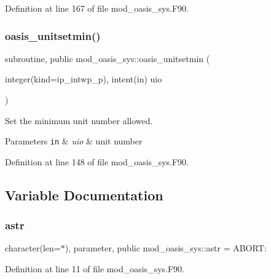 Definition at line 167 of file mod\+\_\+oasis\+\_\+sys.\+F90.

\mbox{\label{namespacemod__oasis__sys_a063a41b73546564afd294fd5708b6667}} 
\subsubsection{\texorpdfstring{oasis\+\_\+unitsetmin()}{oasis\_unitsetmin()}}
{\footnotesize\ttfamily subroutine, public mod\+\_\+oasis\+\_\+sys\+::oasis\+\_\+unitsetmin (\begin{DoxyParamCaption}\item[{integer(kind=ip\+\_\+intwp\+\_\+p), intent(in)}]{uio }\end{DoxyParamCaption})}



Set the minimum unit number allowed. 


\begin{DoxyParams}[1]{Parameters}
\mbox{\tt in}  & {\em uio} & unit number \\
\hline
\end{DoxyParams}


Definition at line 148 of file mod\+\_\+oasis\+\_\+sys.\+F90.



\subsection{Variable Documentation}
\mbox{\label{namespacemod__oasis__sys_aad26202d309c5b33de4cddb54c7edc99}} 
\subsubsection{\texorpdfstring{astr}{astr}}
{\footnotesize\ttfamily character(len=$\ast$), parameter, public mod\+\_\+oasis\+\_\+sys\+::astr = \textquotesingle{} A\+B\+O\+R\+T\+: \textquotesingle{}}



Definition at line 11 of file mod\+\_\+oasis\+\_\+sys.\+F90.

